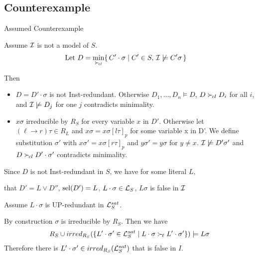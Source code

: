 \documentclass[%
handout,
]{beamer}
\begin{document}
\subsection{Counterexample}
\begin{frame}[allowframebreaks]{Assumed Counterexample}

    Assume $\mathcal{I}$ is not a model of $S$.
    \begin{align*}
        \text{Let }
        D &= \min_{\mathrel\succ_{\!cl}}\{\,
        C'\cdot\sigma \mid C'\in S,\,
        \mathcal{I}\not\models C'\sigma\,
        \}
    \end{align*}

    Then
    \begin{itemize}
        \item $D = D'\cdot\sigma$ is not Inst-redundant. Otherwise
        $D_1,\ldots,D_n\models D$, $D\mathrel\succ_{\!cl} D_i$ for all $i$,
        and $\mathcal{I}\not\models D_j$ for one $j$ contradicts minimality.
        \item $x\sigma$ irreducible by $R_S$ for every variable $x$ in $D'$.
        Otherwise let $(\ell\to r)\tau\in R_L$ and $x\sigma = x\sigma[l\tau]_p$ for some variable x in D'.
        We define substitution $\sigma'$ with $x\sigma' = x\sigma[r\tau]_p$ and $y\sigma' = y\sigma$ for $y\neq x$.
        $\mathcal{I}\not\models D'\sigma'$ and $D\mathrel\succ_{\!cl} D'\cdot\sigma'$ contradicts minimality.
    \end{itemize}



    Since $D$ is not Inst-redundant in $S$,
    we have for some literal $L$,

    that $D' = L\lor D''$, $\operatorname{sel}(D') = L$, $L\cdot\sigma\in\mathcal{L}_S$,
    $L\sigma$ is false in $\mathcal{I}$

    \vspace{0.7em}
    Assume $L\cdot\sigma$ is UP-redundant in $\mathcal{L}_S^{sat}$.

    \vspace{0.7em}
    By construction $\sigma$ is irreducible by $R_S$. Then we have
    \begin{align*}
        R_S \cup irred_{R_S}(
            \{
            L'\cdot\sigma'\in\mathcal{L}_S^{sat}
            \mid
            L\cdot\sigma \mathrel\succ_{\!\ell} L'\cdot\sigma'
            \}
        )
        \models
        L\sigma
    \end{align*}
    Therefore there is $L'\cdot\sigma'\in irred_{R_S}(\mathcal{L}_S^{sat})$ that is false in $I$.
    \vspace{0.7em}


\end{frame}
\end{document}
